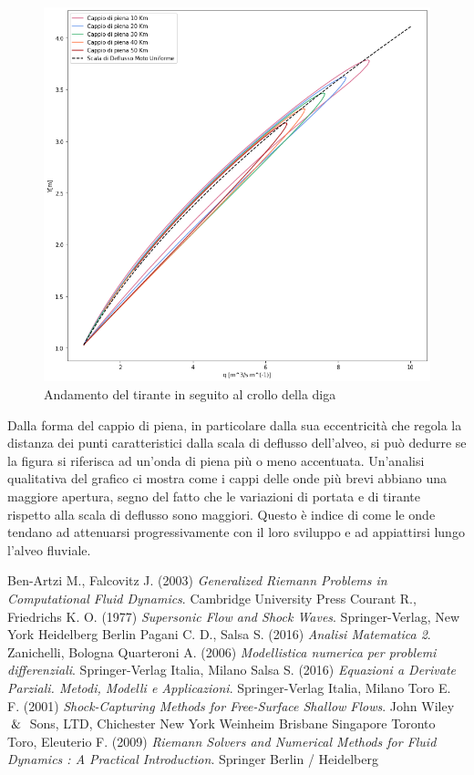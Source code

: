 \documentclass[12pt]{article} %
\begin{document}
\begin{figure} [H]
    \centering
    \includegraphics[scale=0.5,width=18cm]{Cappio.png}
    \caption{Andamento del tirante in seguito al crollo della diga}
    \label{fig:cappio}
\end{figure}

\noindent Dalla forma del cappio di piena, in particolare dalla sua eccentricità che regola la distanza dei punti caratteristici dalla scala di deflusso dell'alveo, si può dedurre se la figura si riferisca ad un'onda di piena più o meno accentuata.
Un'analisi qualitativa del grafico ci mostra come i cappi delle onde più brevi abbiano una maggiore apertura, segno del fatto che le variazioni di portata e di tirante rispetto alla scala di deflusso sono maggiori. Questo è indice di come le onde tendano ad attenuarsi progressivamente con il loro sviluppo e ad appiattirsi lungo l'alveo fluviale.

\newpage
\begin{thebibliography}{}
Ben-Artzi M., Falcovitz J. (2003) \textit{Generalized Riemann Problems in Computational Fluid Dynamics}. Cambridge University Press
Courant R., Friedrichs K. O. (1977) \textit{Supersonic Flow and Shock Waves}. Springer-Verlag, New York Heidelberg Berlin
Pagani C. D., Salsa S. (2016) \textit{Analisi Matematica 2}. Zanichelli, Bologna
Quarteroni A. (2006) \textit{Modellistica numerica per problemi differenziali}. Springer-Verlag Italia, Milano
Salsa S. (2016) \textit{Equazioni a Derivate Parziali. Metodi, Modelli e Applicazioni}. Springer-Verlag Italia, Milano
Toro E. F. (2001) \textit{Shock-Capturing Methods for Free-Surface Shallow Flows}. John Wiley $\And$ Sons, LTD, Chichester New York Weinheim Brisbane Singapore Toronto
Toro, Eleuterio F. (2009) \textit{Riemann Solvers and Numerical Methods for Fluid Dynamics : A Practical Introduction}. Springer Berlin / Heidelberg 
\end{thebibliography}
\end{document}
